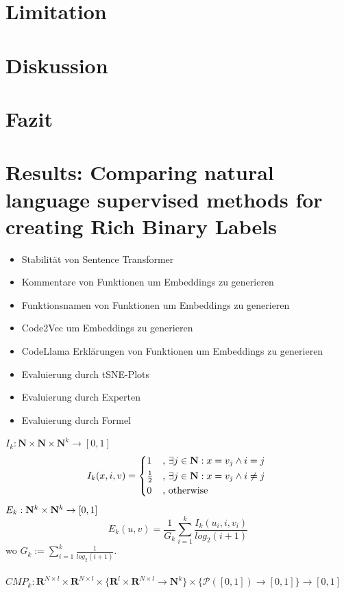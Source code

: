 \documentclass[12pt,letterpaper,ngerman]{article}
\begin{document}
\section{Limitation}
\section{Diskussion}
\section{Fazit}
\section{Results: Comparing natural language supervised methods for creating Rich Binary Labels}
\begin{itemize}
  \item Stabilität von Sentence Transformer
  \item Kommentare von Funktionen um Embeddings zu generieren
  \item Funktionsnamen von Funktionen um Embeddings zu generieren
  \item Code2Vec um Embeddings zu generieren
  \item CodeLlama Erklärungen von Funktionen um Embeddings zu generieren
  \item Evaluierung durch tSNE-Plots
  \item Evaluierung durch Experten
  \item Evaluierung durch Formel
\end{itemize}
$ I_{k}: \mathbf{N} \times \mathbf{N} \times \mathbf{N}^{k} \to [0,1]$
\[ I_{k}(x,i,v) = \begin{cases*} 
      1 & , $\exists j \in \mathbf{N}: x = v_j \land i = j$  \\
      \frac{1}{2} & , $\exists j \in \mathbf{N}: x = v_j \land i \neq j$\\
      0   & , \text{otherwise}
                \end{cases*} \]
$E_k: \mathbf{N}^k \times \mathbf{N}^k \to [0,1]$
\[ E_k(u,v) = \frac{1}{G_k} \sum^{k}_{i=1} \frac{I_k(u_i,i,v_i)}{log_2(i+1)}\]
wo $G_k := \sum_{i=1}^{k} \frac{1}{log_2(i+1)}$.\\\\
$CMP_k: \mathbf{R}^{N\times l} \times \mathbf{R}^{N\times l} \times 
\{ \mathbf{R}^l \times \mathbf{R}^{N\times l} \to \mathbf{N}^k \} 
\times \{ \mathcal{P}([0,1]) \to [0,1] \} \to [0,1]$
\end{document}
